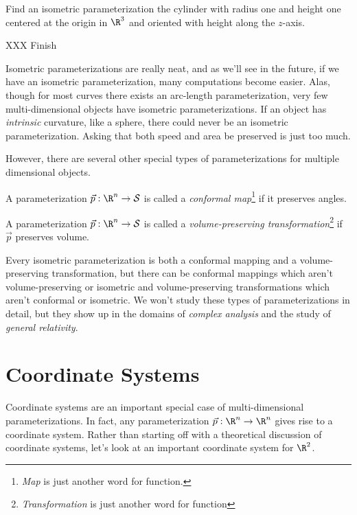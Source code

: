 \begin{example}
	Find an isometric parameterization the cylinder with radius one and height one centered at
	the origin in $\R^3$ and oriented with height along the $z$-axis.

	XXX Finish
\end{example}

Isometric parameterizations are really neat, and as we'll see in the future, if we have an isometric
parameterization, many computations become easier.  Alas, though for most curves there exists
an arc-length parameterization, very few multi-dimensional objects have isometric parameterizations.
If an object has \emph{intrinsic} curvature, like a sphere, there could never be an isometric parameterization.
Asking that both speed and area be preserved is just too much.

However, there are several other special types of parameterizations for multiple dimensional objects.

\begin{definition}
	A parameterization $\vec p:\R^n\to\mathcal S$ is called a \emph{conformal map}\footnote{ \emph{Map}
	is just another word for function.}
	if it preserves angles.
\end{definition}

\begin{definition}
	A parameterization $\vec p:\R^n\to\mathcal S$ is called a \emph{volume-preserving transformation}\footnote{ 
	\emph{Transformation} is just another word for function} if $\vec p$ preserves volume.
\end{definition}

Every isometric parameterization is both a conformal mapping and a volume-preserving transformation, but
there can be conformal mappings which aren't volume-preserving or isometric and volume-preserving transformations
which aren't conformal or isometric.  We won't study these types of parameterizations in detail, but
they show up in the domains of \emph{complex analysis} and the study of \emph{general relativity}.


\begin{exercises}
\end{exercises}

\section{Coordinate Systems}

Coordinate systems are an important special case of multi-dimensional parameterizations.
In fact, any parameterization $\vec p:\R^n\to\R^n$ gives rise to a coordinate system.  Rather than
starting off with a theoretical discussion of coordinate systems,
let's look at an
important coordinate system for $\R^2$.

